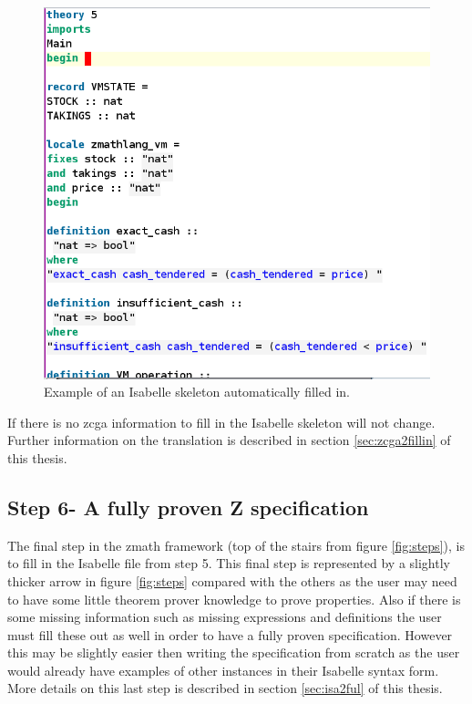 \begin{figure}[H]
 \begin{center}
 \includegraphics [scale=0.3]{Figures/Design/fillin1.png}
 \caption{Example of an Isabelle skeleton automatically filled in.}
 \label{fig:fillin1}
\end{center}
\end{figure} 

 If there is no \gls{zcga} information to fill in the Isabelle skeleton will not change. Further information on the translation is described in section \ref{sec:zcga2fillin} of this thesis.

\subsection{Step 6- A fully proven Z specification}

The final step in the \gls{zmath} framework (top of the stairs from figure \ref{fig:steps}), is to fill in the Isabelle file from step 5. This final step is represented by a slightly thicker arrow in figure \ref{fig:steps} compared with the others as the user may need to have some little theorem prover knowledge to prove properties. Also if there is some missing information such as missing expressions and definitions the user must fill these out as well in order to have a fully proven specification. However this may be slightly easier then writing the specification from scratch as the user would already have examples of other instances in their Isabelle syntax form. More details on this last step is described in section \ref{sec:isa2ful} of this thesis.

